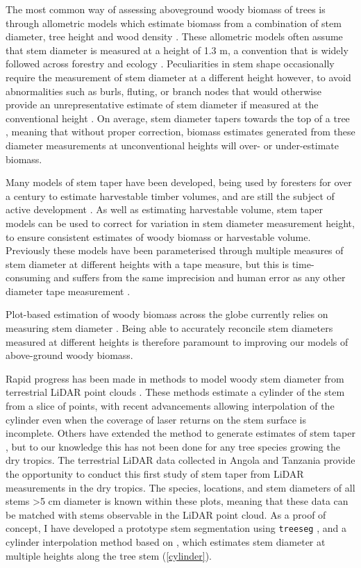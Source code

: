 \begin{refsection}
The most common way of assessing aboveground woody biomass of trees is through allometric models which estimate biomass from a combination of stem diameter, tree height and wood density \citep{Chave2014}. These allometric models often assume that stem diameter is measured at a height of 1.3 m, a convention that is widely followed across forestry and ecology \citep{Brokaw2000}. Peculiarities in stem shape occasionally require the measurement of stem diameter at a different height however, to avoid abnormalities such as burls, fluting, or branch nodes that would otherwise provide an unrepresentative estimate of stem diameter if measured at the conventional height \citep{Kershaw2017}. On average, stem diameter tapers towards the top of a tree \citep{Kozak1969}, meaning that without proper correction, biomass estimates generated from these diameter measurements at unconventional heights will over- or under-estimate biomass. 

Many models of stem taper have been developed, being used by foresters for over a century to estimate harvestable timber volumes, and are still the subject of active development \citep{MacFarlane2016, Luoma2019}. As well as estimating harvestable volume, stem taper models can be used to correct for variation in stem diameter measurement height, to ensure consistent estimates of woody biomass or harvestable volume. Previously these models have been parameterised through multiple measures of stem diameter at different heights with a tape measure, but this is time-consuming and suffers from the same imprecision and human error as any other diameter tape measurement \citep{Saarinen2019}. 

Plot-based estimation of woody biomass across the globe currently relies on measuring stem diameter \citep{SEOSAW2020, Chave2005, Schepaschenko2019}. Being able to accurately reconcile stem diameters measured at different heights is therefore paramount to improving our models of above-ground woody biomass.

Rapid progress has been made in methods to model woody stem diameter from terrestrial LiDAR point clouds \citep{Bogdanovich2021, Hopkinson2004, Srinivasan2015, Ravaglia2019}. These methods estimate a cylinder of the stem from a slice of points, with recent advancements allowing interpolation of the cylinder even when the coverage of laser returns on the stem surface is incomplete. Others have extended the method to generate estimates of stem taper \citep{Henning2006, Thies2004}, but to our knowledge this has not been done for any tree species growing the dry tropics. The terrestrial LiDAR data collected in Angola and Tanzania provide the opportunity to conduct this first study of stem taper from LiDAR measurements in the dry tropics. The species, locations, and stem diameters of all stems >5 cm diameter is known within these plots, meaning that these data can be matched with stems observable in the LiDAR point cloud. As a proof of concept, I have developed a prototype stem segmentation using \texttt{treeseg} \citep{Burt2018}, and a cylinder interpolation method based on \citet{Umbach2003}, which estimates stem diameter at multiple heights along the tree stem (\autoref{cylinder}).


\end{refsection}
